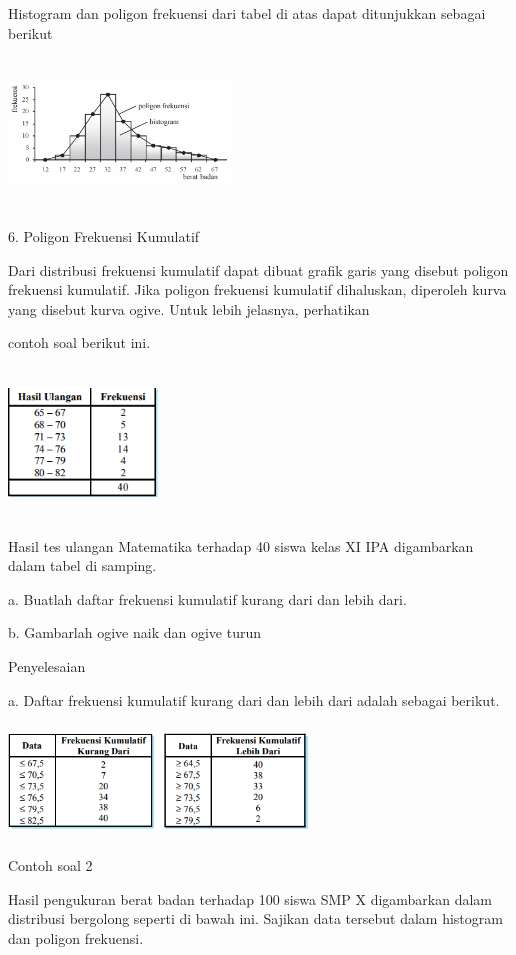 \documentclass[11pt,fleqn]{book} %
\begin{document}
{Histogram dan poligon frekuensi dari tabel di atas dapat ditunjukkan sebagai berikut

\includegraphics[width = 6cm, height= 4cm]{Pictures/11reska.png}

6. Poligon Frekuensi Kumulatif

Dari distribusi frekuensi kumulatif dapat dibuat grafik garis yang disebut poligon
frekuensi kumulatif. Jika poligon frekuensi kumulatif dihaluskan, diperoleh kurva yang
disebut kurva ogive. Untuk lebih jelasnya, perhatikan 

contoh soal berikut ini.

\includegraphics[width = 4cm, height= 4cm]{Pictures/12reska.png}

Hasil tes ulangan Matematika terhadap
40 siswa kelas XI IPA digambarkan dalam
tabel di samping.

a. Buatlah daftar frekuensi kumulatif kurang
dari dan lebih dari.

b. Gambarlah ogive naik dan ogive turun

Penyelesaian

a. Daftar frekuensi kumulatif kurang dari dan lebih dari adalah sebagai berikut.

\includegraphics[width = 8cm, height= 3cm]{Pictures/13reska.png}


Contoh soal 2

Hasil pengukuran berat badan terhadap 100 siswa SMP X digambarkan dalam distribusi bergolong seperti di bawah ini. Sajikan data tersebut dalam histogram dan poligon frekuensi.


}
\end{document}
